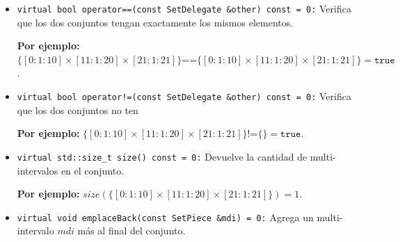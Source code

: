 \begin{itemize}

    \item \texttt{virtual bool operator==(const SetDelegate \&other) const = 0:}  
    Verifica que los dos conjuntos tengan exactamente los mismos elementos.

    \begin{center}
        \textbf{Por ejemplo:} $\{[0: 1: 10] \times [11: 1: 20] \times [21: 1: 21]\}\texttt{==}\{[0: 1: 10] \times [11: 1: 20] \times [21: 1: 21]\}=\texttt{true}$.
    \end{center}

    \item \texttt{virtual bool operator!=(const SetDelegate \&other) const = 0:}  
    Verifica que los dos conjuntos no ten

    \begin{center}
        \textbf{Por ejemplo:} $\{[0: 1: 10] \times [11: 1: 20] \times [21: 1: 21]\}\texttt{!=}\{\}=\texttt{true}$.
    \end{center}

    \item \texttt{virtual std::size\_t size() const = 0:}
     Devuelve la cantidad de multi-intervalos en el conjunto.

    \begin{center}
        \textbf{Por ejemplo:} $size(\{[0: 1: 10] \times [11: 1: 20] \times [21: 1: 21]\})=1$.
    \end{center}
     
     \item \texttt{virtual void emplaceBack(const SetPiece \&mdi) = 0:}
     Agrega un multi-intervalo $mdi$ más al final del conjunto.


\end{itemize}
